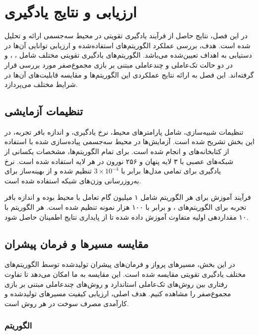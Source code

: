 \chapter{ارزیابی و نتایج یادگیری}

در این فصل، نتایج حاصل از فرآیند یادگیری تقویتی در محیط سه‌جسمی ارائه و تحلیل شده است. هدف، بررسی عملکرد الگوریتم‌های استفاده‌شده و ارزیابی توانایی آن‌ها در دستیابی به اهداف تعیین‌شده می‌باشد. الگوریتم‌های یادگیری تقویتی مختلف شامل ، ،  و  در دو حالت تک‌عاملی و چندعاملی مبتنی بر بازی مجموع‌صفر مورد بررسی قرار گرفته‌اند. این فصل به ارائه نتایج عملکردی این الگوریتم‌ها و مقایسه قابلیت‌های آن‌ها در شرایط مختلف می‌پردازد.

\section{تنظیمات آزمایشی}

تنظیمات شبیه‌سازی، شامل پارامترهای محیط، نرخ یادگیری، و اندازه بافر تجربه، در این بخش تشریح شده است. آزمایش‌ها در محیط سه‌جسمی پیاده‌سازی شده با استفاده از کتابخانه‌های  و  انجام شده است. برای تمام الگوریتم‌ها، مشخصات یکسانی از شبکه‌های عصبی با ۳ لایه پنهان و ۲۵۶ نورون در هر لایه استفاده شده است. نرخ یادگیری برای تمامی مدل‌ها برابر با $3 \times 10^{-4}$ تنظیم شده و از بهینه‌ساز  برای به‌روزرسانی وزن‌های شبکه استفاده شده است.

فرآیند آموزش برای هر الگوریتم شامل ۱ میلیون گام تعامل با محیط بوده و اندازه بافر تجربه برای الگوریتم‌های ،  و  برابر با ۱۰۰ هزار نمونه تنظیم شده است. هر الگوریتم با ۱۰ مقداردهی اولیه متفاوت آموزش داده شده تا از پایداری نتایج اطمینان حاصل شود.

\section{مقایسه مسیرها و فرمان پیشران}

در این بخش، مسیرهای پرواز و فرمان‌های پیشران تولیدشده توسط الگوریتم‌های مختلف یادگیری تقویتی مقایسه شده است. این مقایسه به ما امکان می‌دهد تا تفاوت رفتاری بین روش‌های تک‌عاملی استاندارد و روش‌های چندعاملی مبتنی بر بازی مجموع‌صفر را مشاهده کنیم. هدف اصلی، ارزیابی کیفیت مسیرهای تولیدشده و کارآمدی مصرف سوخت در هر روش است.

\subsection{الگوریتم }

